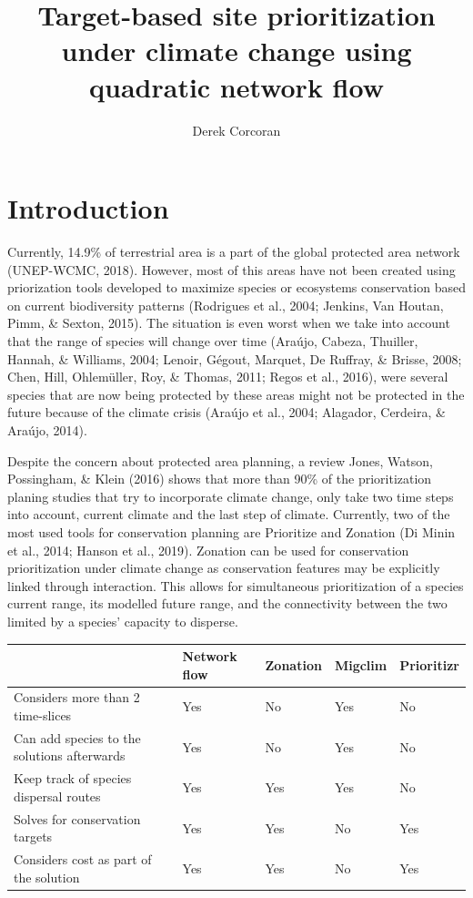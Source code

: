 \documentclass[]{article}
\title{Target-based site prioritization under climate change using quadratic network flow}
\author{Derek Corcoran}
\date{}
\begin{document}
\maketitle

\hypertarget{introduction}{%
\section{Introduction}\label{introduction}}

Currently, 14.9\% of terrestrial area is a part of the global protected area network (UNEP-WCMC, 2018). However, most of this areas have not been created using priorization tools developed to maximize species or ecosystems conservation based on current biodiversity patterns (Rodrigues et al., 2004; Jenkins, Van Houtan, Pimm, \& Sexton, 2015). The situation is even worst when we take into account that the range of species will change over time (Araújo, Cabeza, Thuiller, Hannah, \& Williams, 2004; Lenoir, Gégout, Marquet, De Ruffray, \& Brisse, 2008; Chen, Hill, Ohlemüller, Roy, \& Thomas, 2011; Regos et al., 2016), were several species that are now being protected by these areas might not be protected in the future because of the climate crisis (Araújo et al., 2004; Alagador, Cerdeira, \& Araújo, 2014).

Despite the concern about protected area planning, a review Jones, Watson, Possingham, \& Klein (2016) shows that more than 90\% of the prioritization planing studies that try to incorporate climate change, only take two time steps into account, current climate and the last step of climate. Currently, two of the most used tools for conservation planning are Prioritize and Zonation (Di Minin et al., 2014; Hanson et al., 2019). Zonation can be used for conservation prioritization under climate change as conservation features may be explicitly linked through interaction. This allows for simultaneous prioritization of a species current range, its modelled future range, and the connectivity between the two limited by a species' capacity to disperse.

\begin{table}[H]
\centering
\begin{tabular}{lllll}
\toprule
 & Network flow & Zonation & Migclim & Prioritizr\\
\midrule
Considers more than 2 time-slices & Yes & No & Yes & No\\
Can add species to the solutions afterwards & Yes & No & Yes & No\\
Keep track of species dispersal routes & Yes & Yes & Yes & No\\
Solves for conservation targets & Yes & Yes & No & Yes\\
Considers cost as part of the solution & Yes & Yes & No & Yes\\
\bottomrule
\end{tabular}
\end{table}
\end{document}
